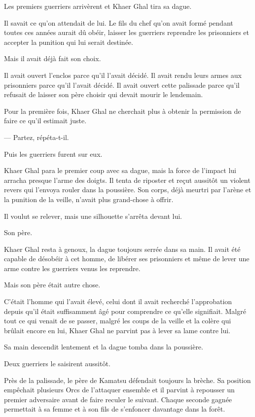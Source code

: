 Les premiers guerriers arrivèrent et Khaer Ghal tira sa dague.

Il savait ce qu'on attendait de lui. Le fils du chef qu'on avait formé pendant
toutes ces années aurait dû obéir, laisser les guerriers reprendre les
prisonniers et accepter la punition qui lui serait destinée.

Mais il avait déjà fait son choix.

Il avait ouvert l'enclos parce qu'il l'avait décidé. Il avait rendu leurs armes
aux prisonniers parce qu'il l'avait décidé. Il avait ouvert cette palissade
parce qu'il refusait de laisser son père choisir qui devait mourir le
lendemain.

Pour la première fois, Khaer Ghal ne cherchait plus à obtenir la permission de
faire ce qu'il estimait juste.

— Partez, répéta-t-il.

Puis les guerriers furent sur eux.

\scenebreak

Khaer Ghal para le premier coup avec sa dague, mais la force de l'impact lui
arracha presque l'arme des doigts. Il tenta de riposter et reçut aussitôt un
violent revers qui l'envoya rouler dans la poussière. Son corps, déjà meurtri
par l'arène et la punition de la veille, n'avait plus grand-chose à offrir.

Il voulut se relever, mais une silhouette s'arrêta devant lui.

Son père.

Khaer Ghal resta à genoux, la dague toujours serrée dans sa main. Il avait été
capable de désobéir à cet homme, de libérer ses prisonniers et même de lever
une arme contre les guerriers venus les reprendre.

Mais son père était autre chose.

C'était l'homme qui l'avait élevé, celui dont il avait recherché
l'approbation depuis qu'il était suffisamment âgé pour comprendre ce qu'elle
signifiait. Malgré tout ce qui venait de se passer, malgré les coups de la
veille et la colère qui brûlait encore en lui, Khaer Ghal ne parvint pas à
lever sa lame contre lui.

Sa main descendit lentement et la dague tomba dans la poussière.

Deux guerriers le saisirent aussitôt.

Près de la palissade, le père de Kamatsu défendait toujours la brèche. Sa
position empêchait plusieurs Orcs de l'attaquer ensemble et il parvint à
repousser un premier adversaire avant de faire reculer le suivant. Chaque
seconde gagnée permettait à sa femme et à son fils de s'enfoncer davantage
dans la forêt.

